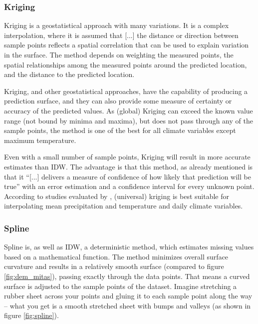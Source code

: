 \subsubsection{Kriging}

Kriging is a geostatistical approach with many variations. It is a complex interpolation, where it is assumed that \ldq{}[...] the distance or direction between sample points reflects a spatial correlation that can be used to explain variation in the surface\rdq{}. \cite[p.11605]{elumalai_spatial_2017} The method depends on weighting the measured points, the spatial relationships among the measured points around the predicted location, and the distance to the predicted location. \cite{wenjing_cao_study_2009}

Kriging, and other geostatistical approaches, have the capability of producing a prediction surface, and they can also provide some measure of certainty or accuracy of the predicted values. \cite{samanta_interpolation_2012} As (global) Kriging can exceed the known value range (not bound by minima and maxima), but does not pass through any of the sample points, the method is one of the best for all climate variables except maximum temperature. \cite{gis_resources_choosing_2013}

Even with a small number of sample points, Kriging will result in more accurate estimates than IDW. \cite{lam_spatial_2009} The advantage is that this method, as already mentioned is that it “[...] delivers a measure of confidence of how likely that prediction will be true” with an error estimation and a confidence interval for every unknown point. \cite{lam_spatial_2009} According to studies evaluated by \citeauthor{hofstra_comparison_2008}, (universal) kriging is best suitable for interpolating mean precipitation and temperature and daily climate variables. 

\subsubsection{Spline}

Spline is, as well as IDW, a deterministic method, which estimates missing values based on a mathematical function. The method minimizes overall \ldq{}surface curvature\rdq{} and results in a relatively smooth surface (compared to figure \ref{fig:dem_mitas}), passing exactly through the data points. \cite{samanta_interpolation_2012} That means a curved surface is adjusted to the sample points of the dataset. \ldq{}Imagine stretching a rubber sheet across your points and gluing it to each sample point along the way -- what you get is a smooth stretched sheet with bumps and valleys\rdq{} (as shown in figure \ref{fig:spline}). \cite{wasser_going_2020}

